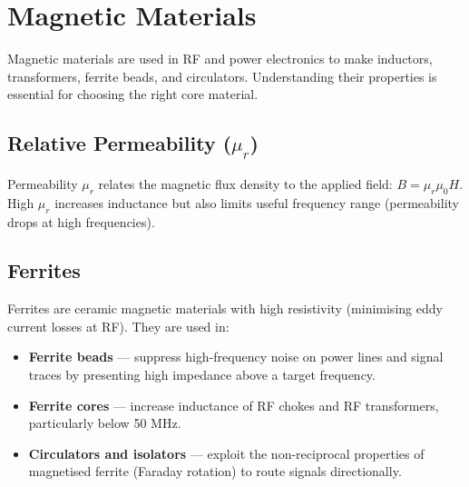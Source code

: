 \section{Magnetic Materials}\label{sec:wiki_magnetic_materials}



Magnetic materials are used in RF and power electronics to make inductors, transformers, ferrite beads, and circulators. Understanding their properties is essential for choosing the right core material.

				

\subsection{Relative Permeability ($\mu_r$)}

				

Permeability $\mu_r$ relates the magnetic flux density to the applied field: $B = \mu_r\mu_0 H$. High $\mu_r$ increases inductance but also limits useful frequency range (permeability drops at high frequencies).


				

\subsection{Ferrites}

				

Ferrites are ceramic magnetic materials with high resistivity (minimising eddy current losses at RF). They are used in:

				
\begin{itemize}

					\item \textbf{Ferrite beads} — suppress high-frequency noise on power lines and signal traces by presenting high impedance above a target frequency.

					\item \textbf{Ferrite cores} — increase inductance of RF chokes and RF transformers, particularly below 50 MHz.

					\item \textbf{Circulators and isolators} — exploit the non-reciprocal properties of magnetised ferrite (Faraday rotation) to route signals directionally.

				
\end{itemize}

